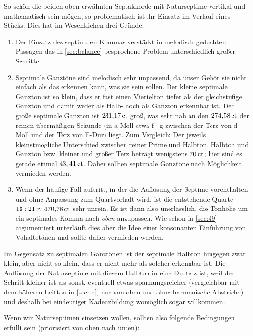 So schön die beiden oben erwähnten Septakkorde mit Naturseptime vertikal und
mathematisch sein mögen, so problematisch ist ihr Einsatz im Verlauf eines
Stücks. Dies hat im Wesentlichen drei Gründe:
\begin{enumerate}
\item Der Einsatz des septimalen Kommas verstärkt in melodisch gedachten
  Passagen das in \cref{sec:balance} besprochene Problem unterschiedlich großer
  Schritte.
\item Septimale Ganztöne sind melodisch sehr unpassend, da unser Gehör sie nicht
  einfach als das erkennen kann, was sie sein sollen. Der kleine septimale
  Ganzton ist so klein, dass er fast einen Viertelton tiefer als der
  gleichstufige Ganzton und damit weder als Halb- noch als Ganzton erkennbar
  ist. Der große septimale Ganzton ist $231{,}17\,\text{ct}$ groß, was sehr nah an den
  $274{,}58\,\text{ct}$ der reinen übermäßigen Sekunde (in a-Moll etwa \naturalp
  f\,–\,\sharpm g zwischen der Terz von d-Moll und der Terz von E-Dur)
  liegt. Zum Vergleich: Der jeweils kleinstmögliche Unterschied zwischen reiner
  Prime und Halbton, Halbton und Ganzton bzw. kleiner und großer Terz beträgt
  wenigstens $70\,\text{ct}$; hier sind es gerade einmal $43,41\,\text{ct}$.  Daher
  sollten septimale Ganztöne nach Möglichkeit vermieden werden.
\item Wenn der häufige Fall auftritt, in der die Auflösung der Septime
  vorenthalten und ohne Anpassung zum Quartvorhalt wird, ist die entstehende
  Quarte $16:21 \approx 470{,}78\,\text{ct}$ sehr unrein.  Es ist dann also
  unerlässlich, die Tonhöhe um ein septimales Komma nach \emph{oben}
  anzupassen. Wie schon in \cref{sec:49} argumentiert unterläuft dies aber die
  Idee einer konsonanten Einführung von Vohaltetönen und sollte daher vermieden
  werden.
\end{enumerate}
Im Gegensatz zu septimalen Ganztönen ist der septimale Halbton hingegen zwar
klein, aber nicht so klein, dass er nicht mehr als solcher erkennbar ist. Die
Auflösung der Naturseptime mit diesem Halbton in eine Durterz ist, weil der
Schritt kleiner ist als sonst, eventuell etwas spannungsreicher (vergleichbar
mit dem höheren Leitton in \cref{sec:ln}, nur von oben und ohne harmonische
Abstriche) und deshalb bei eindeutiger Kadenzbildung womöglich sogar willkommen.

Wenn wir Naturseptimen einsetzen wollen, sollten also folgende Bedingungen
erfüllt sein (priorisiert von oben nach unten):


